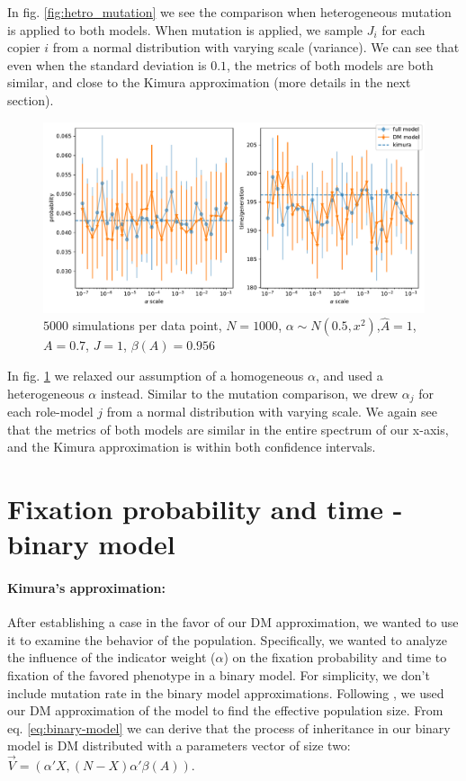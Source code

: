 \documentclass[11pt]{article}
\begin{document}
In fig. \ref{fig:hetro_mutation} we see the comparison when heterogeneous mutation is applied to both models. When mutation is applied, we sample $J_i$ for each copier $i$ from a normal distribution with varying scale (variance).
We can see that even when the standard deviation is $0.1$, the metrics of both models are both similar, and close to the Kimura approximation (more details in the next section). 

\begin{figure}
    \includegraphics[width=\linewidth]{../figures/binary/full_vs_dm_changing_alpha.pdf}
  \caption{$5000$ simulations per data point, $N=1000$, $\alpha\sim N(0.5,x^2)$,$\hat{A}=1$,$A=0.7$, $J=1$, $\beta(A)=0.956$}	
  \label{fig:hetro_alpha}
\end{figure}

In fig. \ref{fig:hetro_alpha} we relaxed our assumption of a homogeneous $\alpha$, and used a heterogeneous $\alpha$ instead. Similar to the mutation comparison, we drew $\alpha_j$ for each role-model $j$ from a normal distribution with varying scale. We again see that the metrics of both models are similar in the entire spectrum of our x-axis, and the Kimura approximation is within both confidence intervals.

\section{Fixation probability and time - binary model}
\paragraph{Kimura's approximation:}
After establishing a case in the favor of our DM approximation, we wanted to use it to examine the behavior of the population. Specifically, we wanted to analyze the influence of the indicator weight ($\alpha$) on the fixation probability and time to fixation of the favored phenotype in a binary model.
For simplicity, we don't include mutation rate in the binary model approximations.
Following \citet{durret}, we used our DM approximation of the model to find the effective population size. From eq. \ref{eq:binary-model} we can derive that the process of inheritance in our binary model is DM distributed with a parameters vector of size two: $\vec{V}=(\alpha'X,(N-X)\alpha'\beta(A))$.
\end{document}

